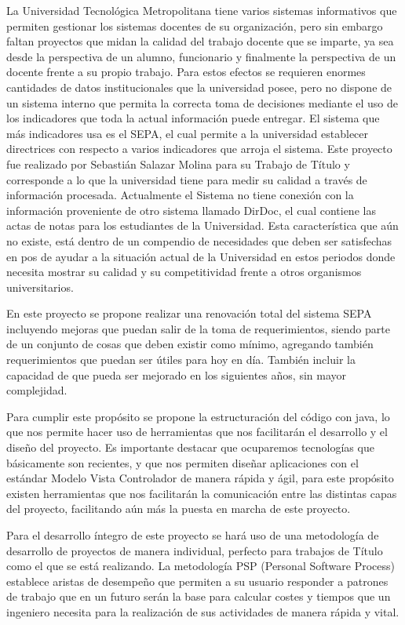 \documentclass[a4paper,12pt,openany,oneside]{book}
\begin{document}
La Universidad Tecnológica Metropolitana tiene varios sistemas informativos que permiten gestionar los sistemas docentes de su organización, pero sin embargo faltan proyectos que midan la calidad del trabajo docente que se imparte, ya sea desde la perspectiva de un alumno, funcionario y finalmente la perspectiva de un docente frente a su propio trabajo. Para estos efectos se requieren enormes cantidades de datos institucionales que la universidad posee, pero no dispone de un sistema interno que permita la correcta toma de decisiones mediante el uso de los indicadores que toda la actual información puede entregar. El sistema que más indicadores usa es el SEPA, el cual permite a la universidad establecer directrices con respecto a varios indicadores que arroja el sistema. Este proyecto fue realizado por Sebastián Salazar Molina para su Trabajo de Título y corresponde a lo que la universidad tiene para medir su calidad a través de información procesada. Actualmente el Sistema no tiene conexión con la información proveniente de otro sistema llamado DirDoc, el cual contiene las actas de notas para los estudiantes de la Universidad. Esta característica que aún no existe, está dentro de un compendio de necesidades que deben ser satisfechas en pos de ayudar a la situación actual de la Universidad en estos periodos donde necesita mostrar su calidad y su competitividad frente a otros organismos universitarios.

En este proyecto se propone realizar una renovación total del sistema SEPA incluyendo mejoras que puedan salir de la toma de requerimientos, siendo parte de un conjunto de cosas que deben existir como mínimo, agregando también requerimientos que puedan ser útiles para hoy en día. También incluir la capacidad de que pueda ser mejorado en los siguientes años, sin mayor complejidad.

Para cumplir este propósito se propone la estructuración del código con java, lo que nos permite hacer uso de herramientas que nos facilitarán el desarrollo y el diseño del proyecto. Es importante destacar que ocuparemos tecnologías que básicamente son recientes, y que nos permiten diseñar aplicaciones con el estándar Modelo Vista Controlador de manera rápida y ágil, para este propósito existen herramientas que nos facilitarán la comunicación entre las distintas capas del proyecto, facilitando aún más la puesta en marcha de este proyecto.

Para el desarrollo íntegro de este proyecto se hará uso de una metodología de desarrollo de proyectos de manera individual, perfecto para trabajos de Título como el que se está realizando. La metodología PSP (Personal Software Process) establece aristas de desempeño que permiten a su usuario responder a patrones de trabajo que en un futuro serán la base para calcular costes y tiempos que un ingeniero necesita para la realización de sus actividades de manera rápida y vital.
\end{document}

